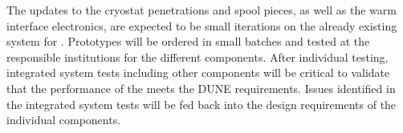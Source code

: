 The updates to the  cryostat penetrations and spool pieces, as well as the warm interface electronics, are expected to be small iterations on the already existing system for .  Prototypes will be ordered in small batches and tested at the responsible institutions for the different components.  After individual testing, integrated system tests including other  components will be critical to validate that the performance of the  meets the DUNE  requirements.  Issues identified in the integrated system tests will be fed back into the design requirements of the individual components.
